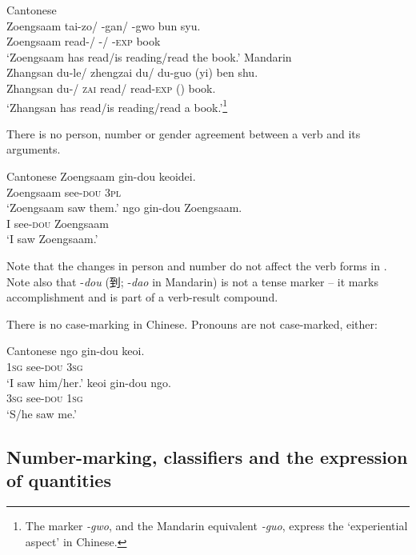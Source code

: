 \documentclass[output=paper,chinesefont,hidelinks]{langscibook}
\begin{document}
    \ea%
    \label{ex:Sinitic:2}
    \ea Cantonese\\
    \gll Zoengsaam  tai-zo/ -gan/ -gwo bun  syu. \\
Zoengsaam  read-\PFV/ -\PROG/ -\textsc{exp}  {\CLF}  book\\
    \glt `Zoengsaam has read/is reading/read the book.'
    \ex Mandarin\\ \gll Zhangsan   du-le/     zhengzai du/           du-guo      (yi)    ben   shu. \\
  Zhangsan   du-\PRF/ \textsc{zai} read/ read-\textsc{exp}  (\NUM)  {\CLF}   book.\\
    \glt `Zhangsan has read/is reading/read a book.'\footnote{The marker \textit{-gwo}, and the Mandarin equivalent \textit{-guo}, express the `experiential aspect' in Chinese.}
    \z\z

There is no person, number or gender agreement between a verb and its arguments.

\ea%
    \label{ex:Sinitic:3} Cantonese
\ea    \gll Zoengsaam  gin-dou  keoidei.\\
        Zoengsaam  see-\textsc{dou}  3\textsc{pl} \\
    \glt`Zoengsaam saw them.'\glt
\ex    \gll ngo  gin-dou  Zoengsaam.\\
        I  see-\textsc{dou}  Zoengsaam \\
    \glt`I saw Zoengsaam.'
    \z\z

    \noindent Note that the changes in person and number do not affect the verb forms in . Note also that -\textit{dou} ({\cn 到}; -\textit{dao} in Mandarin) is not a tense marker – it marks accomplishment and is part of a verb-result compound.

There is no case-marking in Chinese. Pronouns are not case-marked, either:

\ea%
    \label{ex:Sinitic:4} Cantonese
\ea    \gll ngo  gin-dou  keoi.\\
       \textsc{1sg}  see-\textsc{dou}  \textsc{3sg} \\
    \glt `I saw him/her.'
\ex    \gll keoi   gin-dou  ngo.\\
         \textsc{3sg}   see-\textsc{dou}  \textsc{1sg} \\
    \glt `S/he saw me.'
    \z\z

\subsection{Number-marking, classifiers and the expression of quantities}
\label{sec:Sinitic:2.2}
\end{document}
